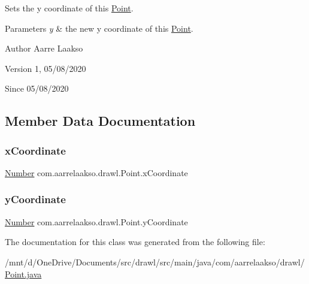 Sets the y coordinate of this \hyperlink{classcom_1_1aarrelaakso_1_1drawl_1_1_point}{Point}. 


\begin{DoxyParams}{Parameters}
{\em y} & the new y coordinate of this \hyperlink{classcom_1_1aarrelaakso_1_1drawl_1_1_point}{Point}. \\
\hline
\end{DoxyParams}
\begin{DoxyAuthor}{Author}
Aarre Laakso 
\end{DoxyAuthor}
\begin{DoxyVersion}{Version}
1, 05/08/2020 
\end{DoxyVersion}
\begin{DoxySince}{Since}
05/08/2020 
\end{DoxySince}


\subsection{Member Data Documentation}
\mbox{\label{classcom_1_1aarrelaakso_1_1drawl_1_1_point_aa5144c5cca82c86f845bead6d4a51041}} 
\subsubsection{\texorpdfstring{x\+Coordinate}{xCoordinate}}
{\footnotesize\ttfamily \hyperlink{interfacecom_1_1aarrelaakso_1_1drawl_1_1_number}{Number} com.\+aarrelaakso.\+drawl.\+Point.\+x\+Coordinate\hspace{0.3cm}{\ttfamily [private]}}

\mbox{\label{classcom_1_1aarrelaakso_1_1drawl_1_1_point_ab84afea50a66677c32ed2fd3100838c7}} 
\subsubsection{\texorpdfstring{y\+Coordinate}{yCoordinate}}
{\footnotesize\ttfamily \hyperlink{interfacecom_1_1aarrelaakso_1_1drawl_1_1_number}{Number} com.\+aarrelaakso.\+drawl.\+Point.\+y\+Coordinate\hspace{0.3cm}{\ttfamily [private]}}



The documentation for this class was generated from the following file\+:\begin{DoxyCompactItemize}
\item 
/mnt/d/\+One\+Drive/\+Documents/src/drawl/src/main/java/com/aarrelaakso/drawl/\hyperlink{_point_8java}{Point.\+java}\end{DoxyCompactItemize}
